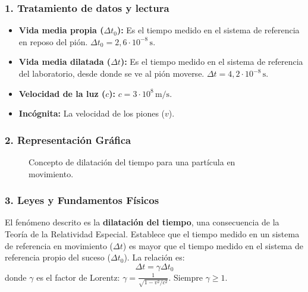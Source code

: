 \subsubsection*{1. Tratamiento de datos y lectura}
\begin{itemize}
    \item \textbf{Vida media propia ($\Delta t_0$):} Es el tiempo medido en el sistema de referencia en reposo del pión. $\Delta t_0 = 2,6 \cdot 10^{-8} \, \text{s}$.
    \item \textbf{Vida media dilatada ($\Delta t$):} Es el tiempo medido en el sistema de referencia del laboratorio, desde donde se ve al pión moverse. $\Delta t = 4,2 \cdot 10^{-8} \, \text{s}$.
    \item \textbf{Velocidad de la luz ($c$):} $c = 3 \cdot 10^8 \, \text{m/s}$.
    \item \textbf{Incógnita:} La velocidad de los piones ($v$).
\end{itemize}

\subsubsection*{2. Representación Gráfica}
\begin{figure}[H]
    \centering
    \caption{Concepto de dilatación del tiempo para una partícula en movimiento.}
\end{figure}

\subsubsection*{3. Leyes y Fundamentos Físicos}
El fenómeno descrito es la \textbf{dilatación del tiempo}, una consecuencia de la Teoría de la Relatividad Especial. Establece que el tiempo medido en un sistema de referencia en movimiento ($\Delta t$) es mayor que el tiempo medido en el sistema de referencia propio del suceso ($\Delta t_0$). La relación es:
$$ \Delta t = \gamma \Delta t_0 $$
donde $\gamma$ es el factor de Lorentz: $\gamma = \frac{1}{\sqrt{1 - v^2/c^2}}$. Siempre $\gamma \ge 1$.


